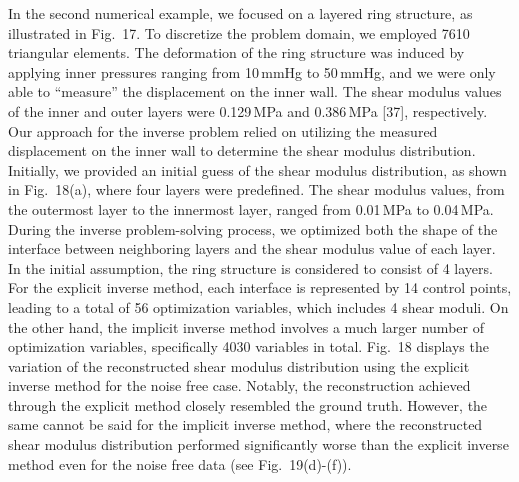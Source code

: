 \documentclass[11pt]{article}
\begin{document}
\noindent
In the second numerical example, we focused on a layered ring
structure, as illustrated in Fig.~17. To discretize the problem
domain, we employed 7610 triangular elements. The deformation of
the ring structure was induced by applying inner pressures ranging
from 10\,mmHg to 50\,mmHg, and we were only able to ``measure'' the
displacement on the inner wall. The shear modulus values of the
inner and outer layers were 0.129\,MPa and 0.386\,MPa [37],
respectively. Our approach for the inverse problem relied on
utilizing the measured displacement on the inner wall to determine
the shear modulus distribution. Initially, we provided an initial
guess of the shear modulus distribution, as shown in Fig.~18(a),
where four layers were predefined. The shear modulus values, from
the outermost layer to the innermost layer, ranged from 0.01\,MPa
to 0.04\,MPa. During the inverse problem-solving process, we
optimized both the shape of the interface between neighboring
layers and the shear modulus value of each layer. In the initial
assumption, the ring structure is considered to consist of 4
layers. For the explicit inverse method, each interface is
represented by 14 control points, leading to a total of 56
optimization variables, which includes 4 shear moduli. On the
other hand, the implicit inverse method involves a much larger
number of optimization variables, specifically 4030 variables in
total. Fig.~18 displays the variation of the reconstructed shear
modulus distribution using the explicit inverse method for the
noise free case. Notably, the reconstruction achieved through the
explicit method closely resembled the ground truth. However, the
same cannot be said for the implicit inverse method, where the
reconstructed shear modulus distribution performed significantly
worse than the explicit inverse method even for the noise free
data (see Fig.~19(d)-(f)).

\end{document}
